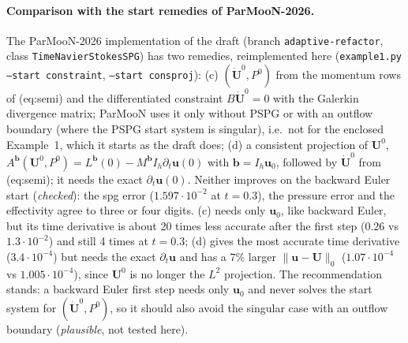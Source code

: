 \documentclass[11pt,a4paper]{article}
\newcommand{\bu}{\boldsymbol{u}}
\newcommand{\bU}{\boldsymbol{U}}
\newcommand{\bud}{\dot{\boldsymbol{U}}}
\newcommand{\code}[1]{\texttt{#1}}
\begin{document}
\paragraph{Comparison with the start remedies of ParMooN-2026.} The ParMooN-2026 implementation of the draft (branch
\code{adaptive-refactor}, class \code{TimeNavierStokesSPG}) has two remedies, reimplemented here
(\code{example1.py --start constraint}, \code{--start consproj}):
(c) $(\bud^0,P^0)$ from the momentum rows of (eq:semi) and the differentiated constraint $B\bud^0=0$ with the Galerkin
divergence matrix; ParMooN uses it only without PSPG or with an outflow boundary (where the PSPG start system is singular),
i.e.\ not for the enclosed Example~1, which it starts as the draft does;
(d) a consistent projection of $\bU^0$, $A^{\boldsymbol b}(\bU^0,P^0)=L^{\boldsymbol b}(0)-M^{\boldsymbol b}I_h\partial_t\bu(0)$ with
$\boldsymbol b=I_h\bu_0$, followed by $\bud^0$ from (eq:semi); it needs the exact $\partial_t\bu(0)$.
Neither improves on the backward Euler start (\emph{checked}): the spg error ($1.597\cdot10^{-2}$ at $t=0.3$), the pressure
error and the effectivity agree to three or four digits. (c) needs only $\bu_0$, like backward Euler, but its time
derivative is about 20 times less accurate after the first step ($0.26$ vs $1.3\cdot10^{-2}$) and still 4 times at $t=0.3$;
(d) gives the most accurate time derivative ($3.4\cdot10^{-4}$) but needs the exact $\partial_t\bu$ and has a $7\%$ larger
$\|\bu-\bU\|_0$ ($1.07\cdot10^{-4}$ vs $1.005\cdot10^{-4}$), since $\bU^0$ is no longer the $L^2$ projection. The recommendation
stands: a backward Euler first step needs only $\bu_0$ and never solves the start system for $(\bud^0,P^0)$, so it should
also avoid the singular case with an outflow boundary (\emph{plausible}, not tested here).
\end{document}
